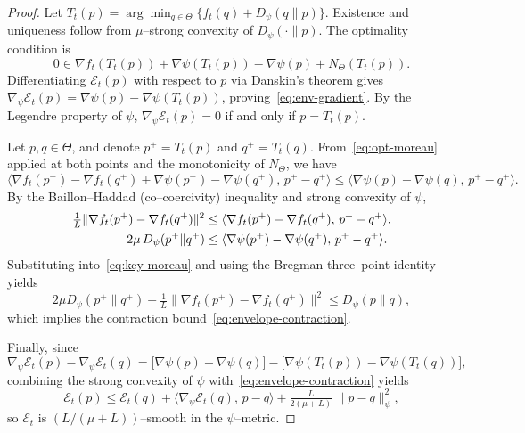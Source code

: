 \documentclass[11pt]{article}
\newcommand{\Ecal}{\mathcal{E}}
\theoremstyle{plain}
\theoremstyle{definition}
\theoremstyle{remark}
\begin{document}
\begin{proof}
Let $T_t(p)=\arg\min_{q\in\Theta}\{f_t(q)+D_\psi(q\|p)\}$.  
Existence and uniqueness follow from $\mu$--strong convexity of $D_\psi(\cdot\|p)$.  
The optimality condition is
\begin{equation}
0\in \nabla f_t(T_t(p))+\nabla\psi(T_t(p))-\nabla\psi(p)+N_\Theta(T_t(p)).
\label{eq:opt-moreau}
\end{equation}
Differentiating $\Ecal_t(p)$ with respect to $p$ via Danskin’s theorem gives
$\nabla_\psi \Ecal_t(p)=\nabla\psi(p)-\nabla\psi(T_t(p))$, proving~\eqref{eq:env-gradient}.
By the Legendre property of $\psi$, $\nabla_\psi \Ecal_t(p)=0$ if and only if $p=T_t(p)$.

Let $p,q\in\Theta$, and denote $p^+=T_t(p)$ and $q^+=T_t(q)$.  
From~\eqref{eq:opt-moreau} applied at both points and the monotonicity of $N_\Theta$, we have
\begin{equation}
\langle\nabla f_t(p^+)-\nabla f_t(q^+)
+\nabla\psi(p^+)-\nabla\psi(q^+),\,p^+-q^+\rangle
\le \langle\nabla\psi(p)-\nabla\psi(q),\,p^+-q^+\rangle.
\label{eq:key-moreau}
\end{equation}
By the Baillon--Haddad (co--coercivity) inequality and strong convexity of $\psi$,
\begin{align}
\tfrac{1}{L}\|\nabla f_t(p^+)-\nabla f_t(q^+)\|^2
&\le \langle\nabla f_t(p^+)-\nabla f_t(q^+),\,p^+-q^+\rangle, \notag\\
2\mu\,D_\psi(p^+\|q^+)
&\le \langle\nabla\psi(p^+)-\nabla\psi(q^+),\,p^+-q^+\rangle.
\label{eq:cocoercivity-strongcvx}
\end{align}
Substituting into~\eqref{eq:key-moreau} and using the Bregman three--point identity yields
\begin{equation}
2\mu D_\psi(p^+\|q^+)
+\tfrac{1}{L}\|\nabla f_t(p^+)-\nabla f_t(q^+)\|^2
\le D_\psi(p\|q),
\label{eq:envelope-base}
\end{equation}
which implies the contraction bound~\eqref{eq:envelope-contraction}.

Finally, since
\[
\nabla_\psi \Ecal_t(p)-\nabla_\psi \Ecal_t(q)
=\big[\nabla\psi(p)-\nabla\psi(q)\big]
-\big[\nabla\psi(T_t(p))-\nabla\psi(T_t(q))\big],
\]
combining the strong convexity of $\psi$ with~\eqref{eq:envelope-contraction} yields
\[
\Ecal_t(p)\le \Ecal_t(q)
+\langle\nabla_\psi \Ecal_t(q),\,p-q\rangle
+\tfrac{L}{2(\mu+L)}\,\|p-q\|_\psi^2,
\]
so $\Ecal_t$ is $(L/(\mu+L))$--smooth in the $\psi$--metric.
\end{proof}

\end{document}
